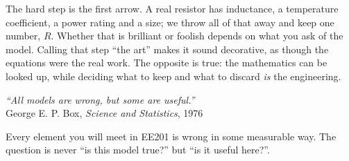 \documentclass[11pt,a4paper]{article}
\begin{document}
\begin{center}
\end{center}

The hard step is the first arrow. A real resistor has inductance, a temperature
coefficient, a power rating and a size; we throw all of that away and keep one number,
$R$. Whether that is brilliant or foolish depends on what you ask of the model. Calling
that step ``the art'' makes it sound decorative, as though the equations were the real
work. The opposite is true: the mathematics can be looked up, while deciding what to keep
and what to discard \emph{is} the engineering.

\begin{center}
\begin{minipage}{0.82\textwidth}
\centering
{\large\itshape ``All models are wrong, but some are useful.''}\\[3pt]
{\small\color{metugray} George E. P. Box, \emph{Science and Statistics}, 1976}
\end{minipage}
\end{center}

Every element you will meet in EE201 is wrong in some measurable way. The question is
never ``is this model true?'' but ``is it useful here?''.
\end{document}
